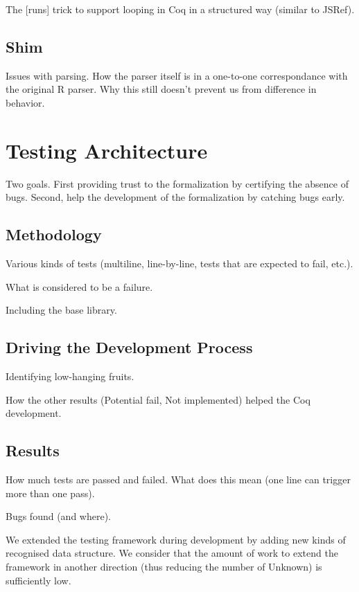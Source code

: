 \documentclass[
    sigplan,
    10pt,
    review, %
    natbib=false %
 ]{acmart}
\begin{document}
The [runs] trick to support looping in Coq in a structured way (similar to JSRef).

\subsection{Shim}
\label{sec:shim}

Issues with parsing.
How the parser itself is in a one-to-one correspondance with the original R parser.
Why this still doesn’t prevent us from difference in behavior.

\section{Testing Architecture}
\label{sec:testing:architecture}

Two goals.
First providing trust to the formalization by certifying the absence of bugs.
Second, help the development of the formalization by catching bugs early.

\subsection{Methodology}
\label{sec:test:methodology}

Various kinds of tests (multiline, line-by-line, tests that are expected to fail, etc.).

What is considered to be a failure.

Including the base library.

\subsection{Driving the Development Process}
\label{sec:driving:development}

Identifying low-hanging fruits.

How the other results (Potential fail, Not implemented) helped the Coq development.

\subsection{Results}
\label{sec:test:results}

How much tests are passed and failed.
What does this mean (one line can trigger more than one pass).

Bugs found (and where).

We extended the testing framework during development by adding new kinds of recognised
data structure.
We consider that the amount of work to extend the framework in another direction
(thus reducing the number of Unknown) is sufficiently low.
\end{document}
